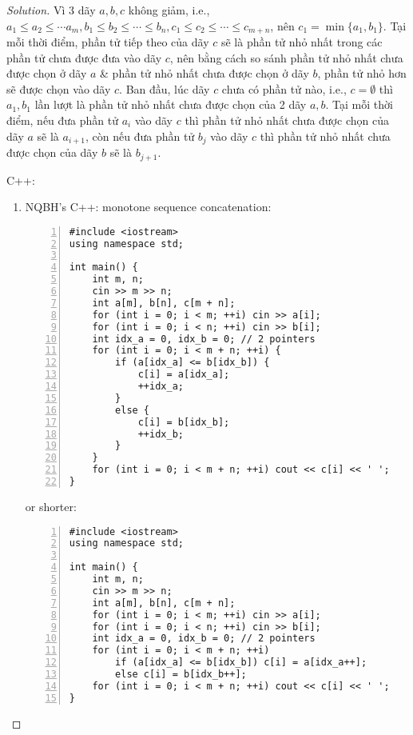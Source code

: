 \documentclass{article}
\begin{document}
\begin{proof}[Solution]
    Vì 3 dãy $a,b,c$ không giảm, i.e., $a_1\le a_2\le\cdots a_m,b_1\le b_2\le\cdots\le b_n,c_1\le c_2\le\cdots\le c_{m+n}$, nên $c_1 = \min\{a_1,b_1\}$. Tại mỗi thời điểm, phần tử tiếp theo của dãy $c$ sẽ là phần tử nhỏ nhất trong các phần tử chưa được đưa vào dãy $c$, nên bằng cách so sánh phần tử nhỏ nhất chưa được chọn ở dãy $a$ \& phần tử nhỏ nhất chưa được chọn ở dãy $b$, phần tử nhỏ hơn sẽ được chọn vào dãy $c$. Ban đầu, lúc dãy $c$ chưa có phần tử nào, i.e., $c = \emptyset$ thì $a_1,b_1$ lần lượt là phần tử nhỏ nhất chưa được chọn của 2 dãy $a,b$. Tại mỗi thời điểm, nếu đưa phần tử $a_i$ vào dãy $c$ thì phần tử nhỏ nhất chưa được chọn của dãy $a$ sẽ là $a_{i+1}$, còn nếu đưa phần tử $b_j$ vào dãy $c$ thì phần tử nhỏ nhất chưa được chọn của dãy $b$ sẽ là $b_{j+1}$.

    C++:
    \begin{enumerate}
        \item NQBH's C++: monotone sequence concatenation:
        \begin{Verbatim}[numbers=left,xleftmargin=5mm]
#include <iostream>
using namespace std;

int main() {
    int m, n;
    cin >> m >> n;
    int a[m], b[n], c[m + n];
    for (int i = 0; i < m; ++i) cin >> a[i];
    for (int i = 0; i < n; ++i) cin >> b[i];
    int idx_a = 0, idx_b = 0; // 2 pointers
    for (int i = 0; i < m + n; ++i) {
        if (a[idx_a] <= b[idx_b]) {
            c[i] = a[idx_a];
            ++idx_a;
        }
        else {
            c[i] = b[idx_b];
            ++idx_b;
        }
    }
    for (int i = 0; i < m + n; ++i) cout << c[i] << ' ';
}
        \end{Verbatim}
        or shorter:
        \begin{Verbatim}[numbers=left,xleftmargin=5mm]
#include <iostream>
using namespace std;

int main() {
    int m, n;
    cin >> m >> n;
    int a[m], b[n], c[m + n];
    for (int i = 0; i < m; ++i) cin >> a[i];
    for (int i = 0; i < n; ++i) cin >> b[i];
    int idx_a = 0, idx_b = 0; // 2 pointers
    for (int i = 0; i < m + n; ++i)
        if (a[idx_a] <= b[idx_b]) c[i] = a[idx_a++];
        else c[i] = b[idx_b++];
    for (int i = 0; i < m + n; ++i) cout << c[i] << ' ';
}
        \end{Verbatim}
    \end{enumerate}
\end{proof}
\end{document}
